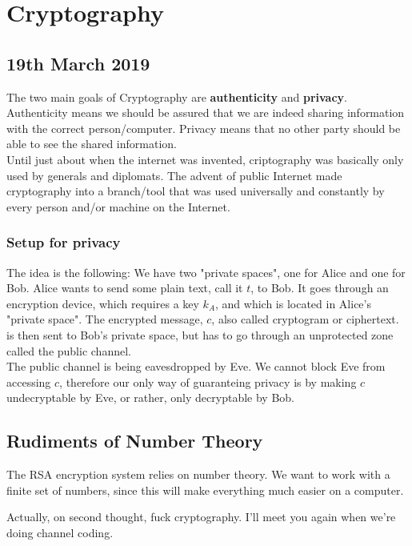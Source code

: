 \documentclass{report}
\begin{document}
\chapter{Cryptography}
\section{19th March 2019}
The two main goals of Cryptography are \textbf{authenticity} and \textbf{privacy}. Authenticity means we should be assured that we are indeed sharing information with the correct person/computer. Privacy means that no other party should be able to see the shared information. \\
 Until just about when the internet was invented, criptography was basically only used by generals and diplomats. The advent of public Internet made cryptography into a branch/tool that was used universally and constantly by every person and/or machine on the Internet.

\subsection{Setup for privacy}
The idea is the following: We have two "private spaces", one for Alice and one for Bob. Alice wants to send some plain text, call it $t$, to Bob. It goes through an encryption device, which requires a key $k_A$, and which is located in Alice's "private space". The encrypted message, $c$, also called cryptogram or ciphertext. is then sent to Bob's private space, but has to go through an unprotected zone called the public channel. \\
 The public channel is being eavesdropped by Eve. We cannot block Eve from accessing $c$, therefore our only way of guaranteing privacy is by making $c$ undecryptable by Eve, or rather, only decryptable by Bob.
 
\section{Rudiments of Number Theory}
The RSA encryption system relies on number theory. We want to work with a finite set of numbers, since this will make everything much easier on a computer. \par

Actually, on second thought, fuck cryptography. I'll meet you again when we're doing channel coding.
\end{document}

